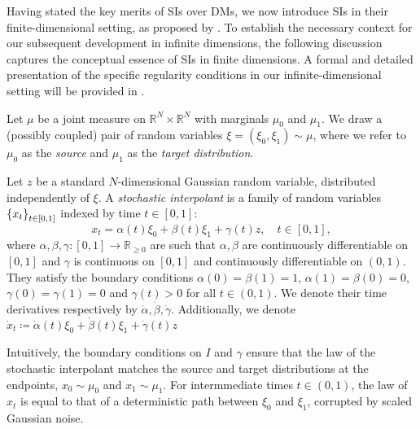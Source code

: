 Having stated the key merits of SIs over DMs, we now introduce SIs in their finite-dimensional setting, as proposed by \citet{albergo2023stochasticinterpolantsunifyingframework,albergo2023stochastic}. To establish the necessary context for our subsequent development in infinite dimensions, the following discussion captures the conceptual essence of SIs in finite dimensions. A formal and detailed presentation of the specific regularity conditions in our infinite-dimensional setting will be provided in .

Let \(\mu\) be a joint measure on \(\mathbb{R}^{N} \times \mathbb{R}^{N}\) with marginals \(\mu_{0}\) and \(\mu_{1}\). We draw a (possibly coupled) pair of random variables \(\xi = (\xi_{0}, \xi_{1}) \sim \mu\), where we refer to \(\mu_{0}\) as the \textit{source} and \(\mu_{1}\) as the \textit{target distribution}.



Let \(z\) be a standard \(N\)-dimensional Gaussian random variable, distributed independently of \(\xi\). A \textit{stochastic interpolant} is a family of random variables \(\qty{x_{t}}_{t \in [0, 1]}\) indexed by time \(t \in [0, 1]\):
\[
  x_{t} = \alpha(t) \xi_{0} + \beta(t) \xi_{1} + \gamma(t)z, \quad t \in [0, 1],
\]
where \(\alpha, \beta, \gamma : [0, 1] \to \mathbb{R}_{\geq 0}\) are such that \(\alpha, \beta\) are  continuously differentiable on \([0, 1]\) and \(\gamma\) is continuous on \([0, 1]\) and continuously differentiable on \((0, 1)\). They satisfy the boundary conditions \(\alpha(0) =  \beta(1) = 1\), \(\alpha(1) = \beta(0) = 0\), \(\gamma(0) = \gamma(1) = 0\) and \(\gamma(t) > 0\) for all \(t \in (0, 1)\). We denote their time derivatives respectively by \(\dot{\alpha}, \dot{\beta}, \dot{\gamma}\). Additionally, we denote \(\dot{x}_{t} \coloneqq \dot{\alpha}(t)\xi_{0} + \dot{\beta}(t) \xi_{1} + \dot{\gamma}(t) z\)

Intuitively, the boundary conditions on \(I\) and \(\gamma\) ensure that the law of the stochastic interpolant matches the source and target distributions at the endpoints, \(x_{0} \sim \mu_{0}\) and \(x_{1} \sim \mu_{1}\). For intermmediate times \(t \in (0, 1)\), the law of \(x_{t}\) is equal to that of a deterministic path between \(\xi_{0}\) and \(\xi_{1}\), corrupted by scaled Gaussian noise.

